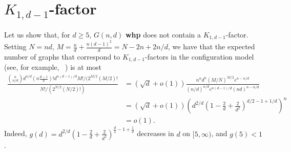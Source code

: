 \documentclass[notitlepage]{scrartcl}
\begin{document}
\appendix
\section[d-1-star-factor]{$K_{1,d-1}$-factor}
\label{appendix}
Let us show that, for $d\ge 5$, $G(n,d)$ \textbf{whp} does not contain a $K_{1,d-1}$-factor. Setting $N=nd$, $M=\frac{n}{d}+\frac{n(d-1)^2}{d}=N-2n+2n/d$, we have that the expected number of graphs that correspond to $K_{1,d-1}$-factors in the configuration model (see, for example, ~\cite{Bol_book}) is at most
\begin{align*}
    \frac{\binom{n}{n/d}d^{n/d}(n\frac{d-1}{d})!d^{n(d-1)/d}M!/(2^{M/2}(M/2)!}{N!/(2^{N/2}(N/2)!)}&=\left(\sqrt{d}+o(1)\right)\frac{n^nd^n(M/N)^{M/2}e^{n-n/d}}{(n/d)^{n/d}e^{n(d-1)/d}(nd)^{n-n/d}}\\
    &=\left(\sqrt{d}+o(1)\right)\left(d^{2/d}\left(1-\frac{2}{d}+\frac{2}{d^2}\right)^{d/2-1+1/d}\right)^n\\
    &=o(1).
\end{align*}
Indeed, $g(d)=d^{2/d}\left(1-\frac{2}{d}+\frac{2}{d^2}\right)^{\frac{d}{2}-1+\frac{1}{d}}$ decreases in $d$ on $[5,\infty)$, and $g(5)<1$.
\end{document}
